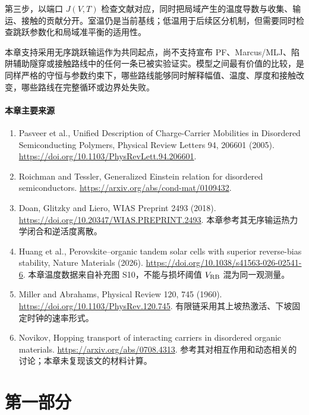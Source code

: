 \documentclass[11pt,a4paper]{article}
\begin{document}
{\cjkfont 第三步，以端口}\allowbreak{} $J(V,T)$ {\cjkfont 检查文献对应，同时把局域产生的温度导数与收集、输运、接触的贡献分开。室温仍是当前基线；低温用于后续区分机制，但需要同时检查跳跃参数化和局域准平衡的适用性。}\allowbreak{}

{\cjkfont 本章支持采用无序跳跃输运作为共同起点，尚不支持宣布}\allowbreak{} PF{\cjkfont 、}\allowbreak{}Marcus/MLJ{\cjkfont 、陷阱辅助隧穿或接触路线中的任何一条已被实验证实。模型之间最有价值的比较，是同样严格的守恒与参数约束下，哪些路线能够同时解释幅值、温度、厚度和接触改变，哪些路线在完整循环或边界处失败。}\allowbreak{}

\subsection{{\cjkfont 本章主要来源}\allowbreak{}}
\begin{enumerate}
\item Pasveer et al., Unified Description of Charge-Carrier Mobilities in Disordered Semiconducting Polymers, Physical Review Letters 94, 206601 (2005). \url{https://doi.org/10.1103/PhysRevLett.94.206601}.
\item Roichman and Tessler, Generalized Einstein relation for disordered semiconductors. \url{https://arxiv.org/abs/cond-mat/0109432}.
\item Doan, Glitzky and Liero, WIAS Preprint 2493 (2018). \url{https://doi.org/10.20347/WIAS.PREPRINT.2493}. {\cjkfont 本章参考其无序输运热力学闭合和逆活度离散。}\allowbreak{}
\item Huang et al., Perovskite--organic tandem solar cells with superior reverse-bias stability, Nature Materials (2026). \url{https://doi.org/10.1038/s41563-026-02541-6}. {\cjkfont 本章温度数据来自补充图}\allowbreak{} S10{\cjkfont ，不能与损坏阈值}\allowbreak{} $V_{\rm RB}$ {\cjkfont 混为同一观测量。}\allowbreak{}
\item Miller and Abrahams, Physical Review 120, 745 (1960). \url{https://doi.org/10.1103/PhysRev.120.745}. {\cjkfont 有限链采用其上坡热激活、下坡固定时钟的速率形式。}\allowbreak{}
\item Novikov, Hopping transport of interacting carriers in disordered organic materials. \url{https://arxiv.org/abs/0708.4313}. {\cjkfont 参考其对相互作用和动态相关的讨论；本章未复现该文的材料计算。}\allowbreak{}
\end{enumerate}
\FloatBarrier
\clearpage

\clearpage
\part*{{\cjkfont 第一部分}\allowbreak{} \allowbreak{}}
\FloatBarrier
\Needspace{110pt}
\end{document}
